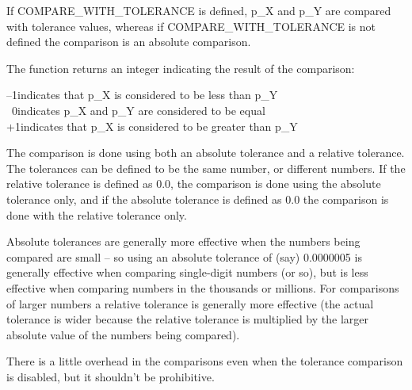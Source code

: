 \medskip
If COMPARE\_WITH\_TOLERANCE is defined, p\_X and p\_Y are compared with tolerance values, whereas if COMPARE\_WITH\_TOLERANCE is not defined the comparison is an absolute comparison.

The function returns an integer indicating the result of the comparison:

\tabto{2em}--1\tabto{4em}indicates that p\_X is considered to be less than p\_Y \\
\tabto{2em}\ 0\tabto{4em}indicates p\_X and p\_Y are considered to be equal \\
\tabto{2em}+1\tabto{4em}indicates that p\_X is considered to be greater than p\_Y

The comparison is done using both an absolute tolerance and a relative tolerance. The tolerances can be defined to be the same number, or different numbers. If the relative tolerance is defined as 0.0, the comparison is done using the absolute tolerance only, and if the absolute tolerance is defined as 0.0 the comparison is done with the relative tolerance only.

Absolute tolerances are generally more effective when the numbers being compared are small -- so using an absolute tolerance of (say) 0.0000005 is generally effective when comparing single-digit numbers (or so), but is less effective when comparing numbers in the thousands or millions. For comparisons of larger numbers a relative tolerance is generally more effective (the actual tolerance is wider because the relative tolerance is multiplied by the larger absolute value of the numbers being compared).

There is a little overhead in the comparisons even when the tolerance comparison is disabled, but it shouldn't be prohibitive.